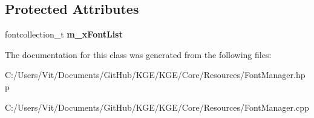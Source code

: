 \subsection*{Protected Attributes}
\begin{DoxyCompactItemize}
\item 
\hypertarget{class_k_g_e_1_1_font_manager_a565480a213fdace5b4df4f1377734b21}{fontcollection\-\_\-t {\bfseries m\-\_\-x\-Font\-List}}\label{class_k_g_e_1_1_font_manager_a565480a213fdace5b4df4f1377734b21}

\end{DoxyCompactItemize}


The documentation for this class was generated from the following files\-:\begin{DoxyCompactItemize}
\item 
C\-:/\-Users/\-Vit/\-Documents/\-Git\-Hub/\-K\-G\-E/\-K\-G\-E/\-Core/\-Resources/Font\-Manager.\-hpp\item 
C\-:/\-Users/\-Vit/\-Documents/\-Git\-Hub/\-K\-G\-E/\-K\-G\-E/\-Core/\-Resources/Font\-Manager.\-cpp\end{DoxyCompactItemize}
